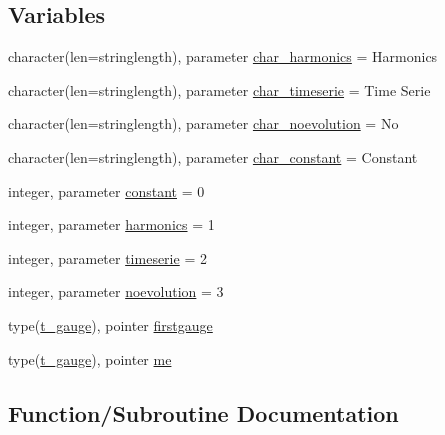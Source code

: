 \subsection*{Variables}
\begin{DoxyCompactItemize}
\item 
character(len=stringlength), parameter \mbox{\hyperlink{namespacemodulegauge_a94bb84dcdbe9bf7dec1cb0f6b3bffb5d}{char\+\_\+harmonics}} = \textquotesingle{}Harmonics\textquotesingle{}
\item 
character(len=stringlength), parameter \mbox{\hyperlink{namespacemodulegauge_ada4bd7e74d44c2a75f7fd3dabdaec4f6}{char\+\_\+timeserie}} = \textquotesingle{}Time Serie\textquotesingle{}
\item 
character(len=stringlength), parameter \mbox{\hyperlink{namespacemodulegauge_a6ba029f1e08fcbbbd5908ec2ae512c23}{char\+\_\+noevolution}} = \textquotesingle{}No\textquotesingle{}
\item 
character(len=stringlength), parameter \mbox{\hyperlink{namespacemodulegauge_ac3b02dcb0550cc2e7f9db1a1674271ff}{char\+\_\+constant}} = \textquotesingle{}Constant\textquotesingle{}
\item 
integer, parameter \mbox{\hyperlink{namespacemodulegauge_ae88c58ad24b474ec3b88eca9f0cfd3e1}{constant}} = 0
\item 
integer, parameter \mbox{\hyperlink{namespacemodulegauge_a3f8a746c3c0ad5da35fdd078a57a5cbb}{harmonics}} = 1
\item 
integer, parameter \mbox{\hyperlink{namespacemodulegauge_a44762d942d0bc35a4d1481c829c717ff}{timeserie}} = 2
\item 
integer, parameter \mbox{\hyperlink{namespacemodulegauge_a7fd89ac8c515f3952a0d3a804cbf6391}{noevolution}} = 3
\item 
type(\mbox{\hyperlink{structmodulegauge_1_1t__gauge}{t\+\_\+gauge}}), pointer \mbox{\hyperlink{namespacemodulegauge_a128d19f6ffe523671f625c16c81ba96a}{firstgauge}}
\item 
type(\mbox{\hyperlink{structmodulegauge_1_1t__gauge}{t\+\_\+gauge}}), pointer \mbox{\hyperlink{namespacemodulegauge_a6350897b91533283cb8bab27165a71fe}{me}}
\end{DoxyCompactItemize}


\subsection{Function/\+Subroutine Documentation}
\mbox{\label{namespacemodulegauge_a672a5d3f45d4bf6b413012a0705ca328}} 
